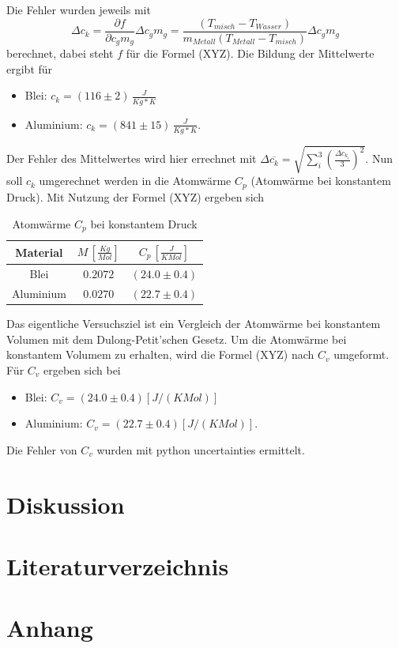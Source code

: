 \documentclass[11pt,ngerman,a4paper]{article}
\begin{document}
\noindent
Die Fehler wurden jeweils mit
\[ \Delta c_k=\frac{\partial f}{\partial c_gm_g}\Delta c_gm_g = \frac{ \left( T_{misch}-T_{Wasser} \right) }{m_{Metall} \left( T_{Metall}-T_{misch}\right)} \Delta c_gm_g\]
berechnet, dabei steht $f$ für die Formel (XYZ).
Die Bildung der Mittelwerte ergibt für
\begin{itemize}
\item Blei: $c_k = (116\pm2)\, \frac{J}{Kg*K}$
\item Aluminium: $c_k = (841\pm15)\, \frac{J}{Kg*K}$.
\end{itemize}
Der Fehler des Mittelwertes wird hier errechnet mit $\Delta \overline{c_k}=\sqrt{\sum_{i}^3 \left(\frac{\Delta c_{k_i}}{3}\right)^2}$.
\newline
Nun soll $c_k$ umgerechnet werden in die Atomwärme $C_p$ (Atomwärme bei konstantem Druck).
Mit Nutzung der Formel (XYZ) ergeben sich
\begin{table}[H]
\centering
\begin{tabular}{|c|c|c|}
\hline
Material & $M\,[\frac{Kg}{Mol}]$ & $C_p \, [\frac{J}{KMol}]$\\
\hline
Blei & $ 0.2072 $ & $(24.0\pm0.4)$\\
Aluminium & $ 0.0270 $ & $(22.7\pm0.4)$\\

\hline
\end{tabular}
\caption{Atomwärme $C_p$ bei konstantem Druck}
\end{table}
\noindent
Das eigentliche Versuchsziel ist ein Vergleich der Atomwärme bei konstantem Volumen mit dem Dulong-Petit'schen Gesetz. Um die Atomwärme bei konstantem Volumem zu erhalten, wird die Formel (XYZ) nach $C_v$ umgeformt. Für $C_v$ ergeben sich bei
\begin{itemize}
\item Blei: $C_v = (24.0\pm0.4)[J/(K Mol)]$
\item Aluminium: $C_v = (22.7\pm0.4)[J/(K Mol)]$.
\end{itemize}
Die Fehler von $C_v$ wurden mit python uncertainties ermittelt.
\newline

\section{Diskussion}


\section{Literaturverzeichnis}

\section{Anhang}
\end{document}
